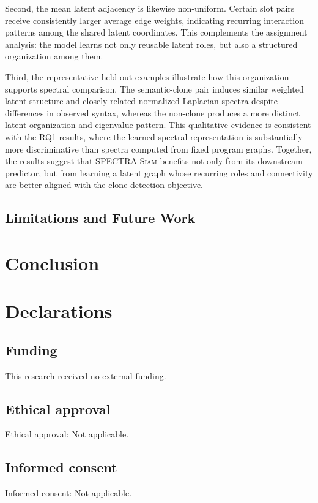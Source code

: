 \documentclass[final,5p,times,twocolumn]{elsarticle}
\newcommand{\method}{\textsc{SPECTRA-Siam}}
\theoremstyle{plain}
\begin{document}
Second, the mean latent adjacency is likewise non-uniform. Certain slot pairs receive consistently larger average edge weights, indicating recurring interaction patterns among the shared latent coordinates. This complements the assignment analysis: the model learns not only reusable latent roles, but also a structured organization among them.

Third, the representative held-out examples illustrate how this organization supports spectral comparison. The semantic-clone pair induces similar weighted latent structure and closely related normalized-Laplacian spectra despite differences in observed syntax, whereas the non-clone produces a more distinct latent organization and eigenvalue pattern. This qualitative evidence is consistent with the RQ1 results, where the learned spectral representation is substantially more discriminative than spectra computed from fixed program graphs. Together, the results suggest that \method{} benefits not only from its downstream predictor, but from learning a latent graph whose recurring roles and connectivity are better aligned with the clone-detection objective.

\subsection{Limitations and Future Work}
\label{sec:limitations}

\section{Conclusion}
\label{sec:conclusion}

\section{Declarations}

\subsection{Funding}
This research received no external funding.

\subsection{Ethical approval}
Ethical approval: Not applicable.

\subsection{Informed consent}
Informed consent: Not applicable.
\end{document}
